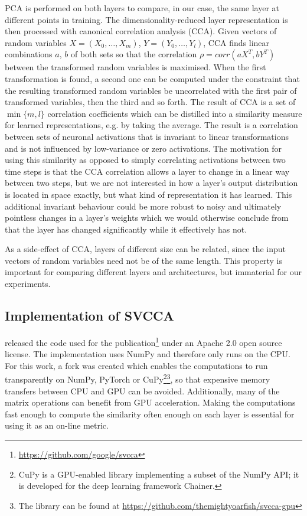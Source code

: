 PCA is performed on both layers to compare, in our case, the same layer at
different points in training. The dimensionality-reduced layer representation is
then processed with canonical correlation analysis (CCA).  Given vectors of
random variables $X=(X_0, \ldots, X_m)$, $Y=(Y_0, \ldots, Y_l)$, CCA finds
linear combinations $a$, $b$ of both sets so that the correlation $\rho =
corr(aX^T, bY^T )$ between the transformed random variables is maximised. When
the first transformation is found, a second one can be computed under the
constraint that the resulting transformed random variables be uncorrelated with
the first pair of transformed variables, then the third and so forth. The result
of CCA is a set of $\min\{m,l\}$ correlation coefficients which can be distilled
into a similarity measure for learned representations, e.g. by taking the
average. The result is a correlation between sets of neuronal activations that
is invariant to linear transformations and is not influenced by low-variance or
zero activations. The motivation for using this similarity as opposed to simply
correlating activations between two time steps is that the CCA correlation
allows a layer to change in a linear way between two steps, but we are not
interested in how a layer's output distribution is located in space exactly, but
what kind of representation it has learned. This additional invariant behaviour
could be more robust to noisy and ultimately pointless changes in a layer's
weights which we would otherwise conclude from that the layer has changed
significantly while it effectively has not.

As a side-effect of CCA, layers of different size can be related, since the
input vectors of random variables need not be of the same length. This property
is important for comparing different layers and architectures, but immaterial
for our experiments.

\subsection{Implementation of SVCCA}%
\label{sub:implementation_of_svcca}

\citeauthor{raghu2017svcca} released the code used for the
publication\footnote{\url{https://github.com/google/svcca}} under an Apache 2.0
open source license. The implementation uses NumPy and therefore only runs on
the CPU. For this work, a fork was created which enables the computations to run
transparently on NumPy, PyTorch or CuPy\footnote{CuPy is a GPU-enabled library
implementing a subset of the NumPy API; it is developed for the deep learning
framework Chainer.}\footnote{The library can be found at
\url{https://github.com/themightyoarfish/svcca-gpu}}, so  that expensive memory
transfers between CPU and GPU can be avoided. Additionally, many of the matrix
operations can benefit from GPU acceleration. Making the computations fast
enough to compute the similarity often enough on each layer is essential for
using it as an on-line metric.

